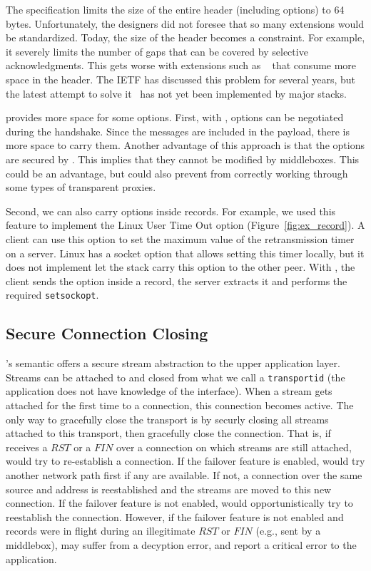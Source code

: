 The \tcp specification limits the size of the entire \tcp header (including options) to 64 bytes. Unfortunately, the \tcp designers did not foresee that so many \tcp extensions would be standardized. Today, the size of the \tcp header
becomes a constraint. For example, it severely limits the number of gaps that
can be covered by selective acknowledgments. This gets worse with extensions
such as \mptcp~\cite{rfc6824} that consume more space in the \tcp header.
The IETF has discussed this problem for several years, but the latest attempt
to solve it~\cite{draft-ietf-tcpm-tcp-edo-10} has not yet been implemented by
major \tcp stacks.

\tcpls provides more space for some \tcp options. First, with \tcpls, \tcp
options can be negotiated during the \tls handshake. Since the \tls messages are
included in the \tcp payload, there is more space to carry them. Another
advantage of this approach is that the \tcp options are secured by \tls. This
implies that they cannot be modified by middleboxes. This could be an advantage,
but could also prevent \tcpls from correctly working through some types of
transparent \tcp proxies.

Second, we can also carry \tcp options inside \tls records. For example, we used
this feature to implement the Linux \tcp User Time Out option
(Figure~\ref{fig:ex_record}). A client
can use this option to set the maximum value of the retransmission
timer on a server. Linux \tcp has a socket option that allows setting
this timer locally, but it does not implement let the stack carry this \tcp
option to the other peer. With \tcpls, the client sends the option inside a \tls
record, the server extracts it and performs the required \texttt{setsockopt}.


\subsection{Secure Connection Closing}

\tcpls's semantic offers a secure stream abstraction to the upper application
layer.
Streams can be attached to and closed from what we call a \texttt{transportid}
(the application does not have knowledge of the \tcp interface). When a stream
gets attached for the first time to a \tcp connection, this connection becomes
active. The only way to gracefully close the transport is by securly closing all
streams attached to this transport, then \tcpls gracefully close the \tcp
connection. That is, if \tcpls receives a $RST$ or a $FIN$ over a \tcp
connection on which streams are still attached, \tcpls would try to re-establish
a \tcp connection. If the failover feature is enabled, \tcpls would try another
network path first if any are available. If not, a connection over the same
source and address is reestablished and the streams are moved to this new \tcp
connection. If the failover feature is not enabled, \tcpls would opportunistically try to
reestablish the connection. However, if the failover feature is not enabled and
records were in flight during an illegitimate $RST$ or $FIN$ (e.g., sent by a
middlebox), \tcpls may suffer from a decyption error, and report a critical
error to the application.



